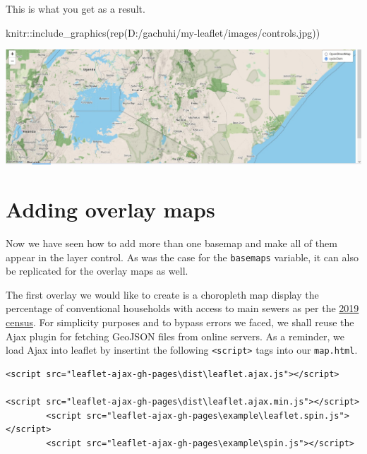 \documentclass[
]{book}
\newenvironment{Shaded}{\begin{snugshade}}{\end{snugshade}}
\newcommand{\FunctionTok}[1]{\textcolor[rgb]{0.00,0.00,0.00}{#1}}
\newcommand{\NormalTok}[1]{#1}
\newcommand{\SpecialCharTok}[1]{\textcolor[rgb]{0.00,0.00,0.00}{#1}}
\newcommand{\StringTok}[1]{\textcolor[rgb]{0.31,0.60,0.02}{#1}}
\begin{document}
This is what you get as a result.

\begin{Shaded}
\begin{Highlighting}[]
\NormalTok{knitr}\SpecialCharTok{::}\FunctionTok{include\_graphics}\NormalTok{(}\FunctionTok{rep}\NormalTok{(}\StringTok{\textquotesingle{}D:/gachuhi/my{-}leaflet/images/controls.jpg\textquotesingle{}}\NormalTok{))}
\end{Highlighting}
\end{Shaded}

\includegraphics[width=26.56in]{../images/controls}

\hypertarget{adding-overlay-maps}{%
\section{Adding overlay maps}\label{adding-overlay-maps}}

Now we have seen how to add more than one basemap and make all of them appear in the layer control. As was the case for the \texttt{basemaps} variable, it can also be replicated for the overlay maps as well.

The first overlay we would like to create is a choropleth map display the percentage of conventional households with access to main sewers as per the \href{https://housingfinanceafrica.org/app/uploads/VOLUME-IV-KPHC-2019.pdf}{2019 census}. For simplicity purposes and to bypass errors we faced, we shall reuse the Ajax plugin for fetching GeoJSON files from online servers. As a reminder, we load Ajax into leaflet by insertint the following \texttt{\textless{}script\textgreater{}} tags into our \texttt{map.html}.

\begin{verbatim}
<script src="leaflet-ajax-gh-pages\dist\leaflet.ajax.js"></script>

<script src="leaflet-ajax-gh-pages\dist\leaflet.ajax.min.js"></script>
        <script src="leaflet-ajax-gh-pages\example\leaflet.spin.js"></script>
        <script src="leaflet-ajax-gh-pages\example\spin.js"></script> 
\end{verbatim}
\end{document}
